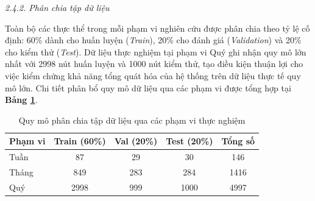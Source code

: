 \textit{2.4.2. Phân chia tập dữ liệu}\vspace{0.2cm}

Toàn bộ các thực thể trong mỗi phạm vi nghiên cứu được phân chia theo tỷ lệ cố định: 60\% dành cho huấn luyện (\textit{Train}), 20\% cho đánh giá (\textit{Validation}) và 20\% cho kiểm thử (\textit{Test}). Dữ liệu thực nghiệm tại phạm vi Quý ghi nhận quy mô lớn nhất với 2998 nút huấn luyện và 1000 nút kiểm thử, tạo điều kiện thuận lợi cho việc kiểm chứng khả năng tổng quát hóa của hệ thống trên dữ liệu thực tế quy mô lớn. Chi tiết phân bổ quy mô dữ liệu qua các phạm vi được tổng hợp tại \textbf{Bảng \ref{tab:DataSplitSize}}.

\begin{table}[H]
    \centering
    \caption{Quy mô phân chia tập dữ liệu qua các phạm vi thực nghiệm}
    \label{tab:DataSplitSize}
    \setlength{\tabcolsep}{12pt}
    \renewcommand{\arraystretch}{1.2}
    \begin{tabular}{|l|c|c|c|c|}
        \hline
        \textbf{Phạm vi} & \textbf{Train (60\%)} & \textbf{Val (20\%)} & \textbf{Test (20\%)} & \textbf{Tổng số} \\ \hline
        Tuần  & 87   & 29  & 30   & 146  \\ \hline
        Tháng & 849  & 283 & 284  & 1416 \\ \hline
        Quý   & 2998 & 999 & 1000 & 4997 \\ \hline
    \end{tabular}
\end{table}